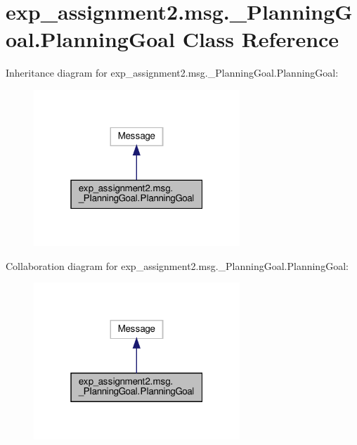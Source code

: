 \hypertarget{classexp__assignment2_1_1msg_1_1__PlanningGoal_1_1PlanningGoal}{}\section{exp\+\_\+assignment2.\+msg.\+\_\+\+Planning\+Goal.\+Planning\+Goal Class Reference}
\label{classexp__assignment2_1_1msg_1_1__PlanningGoal_1_1PlanningGoal}


Inheritance diagram for exp\+\_\+assignment2.\+msg.\+\_\+\+Planning\+Goal.\+Planning\+Goal\+:
\nopagebreak
\begin{figure}[H]
\begin{center}
\leavevmode
\includegraphics[width=220pt]{classexp__assignment2_1_1msg_1_1__PlanningGoal_1_1PlanningGoal__inherit__graph}
\end{center}
\end{figure}


Collaboration diagram for exp\+\_\+assignment2.\+msg.\+\_\+\+Planning\+Goal.\+Planning\+Goal\+:
\nopagebreak
\begin{figure}[H]
\begin{center}
\leavevmode
\includegraphics[width=220pt]{classexp__assignment2_1_1msg_1_1__PlanningGoal_1_1PlanningGoal__coll__graph}
\end{center}
\end{figure}
